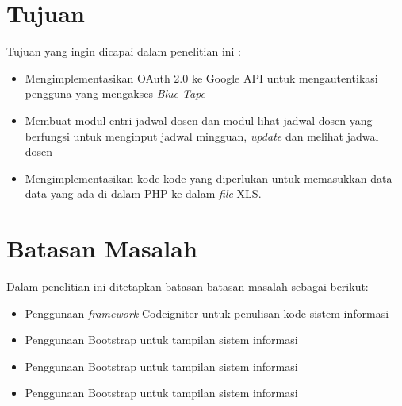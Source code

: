 \section{Tujuan}
\label{sec:tujuan}
Tujuan yang ingin dicapai dalam penelitian ini : 
	\begin{itemize}
		\item Mengimplementasikan OAuth 2.0 ke Google API untuk mengautentikasi pengguna yang mengakses \textit{Blue Tape}
		\item Membuat modul entri jadwal dosen dan modul lihat jadwal dosen yang berfungsi untuk menginput jadwal mingguan, \textit{update} dan melihat jadwal dosen
		\item Mengimplementasikan kode-kode yang diperlukan untuk memasukkan data-data yang ada di dalam PHP ke dalam \textit{file} XLS. 

	\end{itemize}

\section{Batasan Masalah}
\label{sec:batasan}
Dalam penelitian ini ditetapkan batasan-batasan masalah sebagai berikut:
\begin{itemize}
	\item Penggunaan \textit{framework} Codeigniter untuk penulisan kode sistem informasi
	\item Penggunaan Bootstrap untuk tampilan sistem informasi
	\item Penggunaan Bootstrap untuk tampilan sistem informasi
	\item Penggunaan Bootstrap untuk tampilan sistem informasi
\end{itemize}

